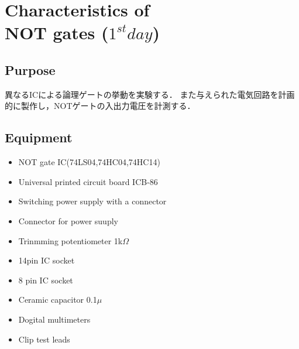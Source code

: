 \documentclass[11pt, a4paper,twocolumn]{jarticle}
\begin{document}
\section{Characteristics of \\NOT gates ($1^{st} day$)}
\subsection{Purpose}
異なるICによる論理ゲートの挙動を実験する．
また与えられた電気回路を計画的に製作し，NOTゲートの入出力電圧を計測する．
\subsection{Equipment}
\begin{itemize}
    \item NOT gate IC(74LS04,74HC04,74HC14)
    \item Universal printed circuit board ICB-86
    \item Switching power supply with a connector
    \item Connector for power suuply
    \item Trinmming potentiometer 1k$\Omega$
    \item 14pin IC socket
    \item 8 pin IC socket
    \item Ceramic capacitor 0.1$\mu$
    \item Dogital multimeters
    \item Clip test leads
\end{itemize}
\end{document}
